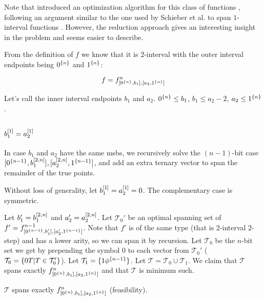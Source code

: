 Note that
\dubovsky{} introduced an optimization algorithm for
this class of functions \cite[section 3.2]{Dubovsky2012},
following an argument similar to the one used by
Schieber et al. to span $1$-interval functions
\cite{Schieber2005154}.
However,
the reduction approach gives
an interesting insight in the problem
and seems easier to describe.

From the definition of $f$ we know that it is $2$-interval
with the outer interval endpoints being
$0^{\{n\}}$ and $1^{\{n\}}$:

\[
f = f^{n}_{[0^{\{n\}}, b_1], [a_2, 1^{\{n\}}]}
\]

Let's call the inner interval endpoints $b_1$ and $a_2$.
$0^{\{n\}} \leq b_1$,
$b_1 \leq a_2 - 2$,
$a_2 \leq 1^{\{n\}}$.

\subsection{\texorpdfstring{$b_1^{[1]} = a_2^{[1]}$}
{b1[1] = a2[1]}
}

In case $b_1$ and $a_2$ have the same \acrshort{msb}s,
we recursively solve the $(n-1)$-bit
case
$[0^{\{n-1\}}, b_1^{[2, n]}],
[a_2^{[2, n]}, 1^{\{n-1\}}]$,
and add an extra ternary vector to span the remainder
of the true points.

Without loss of generality,
let $b_1^{[1]} = a_2^{[1]} = 0$.
The complementary case is symmetric.

Let $b_1' = b_1^{[2, n]}$
and $a_2' = a_2^{[2, n]}$.
Let $\mathcal{T}_0'$ be an optimal spanning set of
$f' = f^{n-1}_{[0^{\{n-1\}}, b_1'], [a_2', 1^{\{n-1\}}]}$.
Note that $f'$ is of the same type
(that is $2$-interval $2$-step)
and has a lower arity,
so we can span it by recursion.
Let $\mathcal{T}_0$ be the $n$-bit set we get
by prepending the symbol $0$
to each vector from $\mathcal{T}_0'$
($\mathcal{T}_0 = \{0 T | T \in \mathcal{T}_0'\}$).
Let $\mathcal{T}_1 = \{1 \phi^{\{n-1\}}\}$.
Let $\mathcal{T} = \mathcal{T}_0 \cup \mathcal{T}_1$.
We claim that $\mathcal{T}$ spans exactly
$f^{n}_{[0^{\{n\}}, b_1], [a_2, 1^{\{n\}}]}$
and that $\mathcal{T}$ is minimum such.

\begin{theorem}
$\mathcal{T}$ spans exactly
$f^{n}_{[0^{\{n\}}, b_1], [a_2, 1^{\{n\}}]}$ (feasibility).
\end{theorem}

